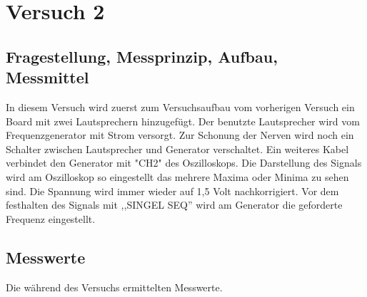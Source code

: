 \documentclass[12pt, oneside, a4paper, \docLanguage]{report}
\begin{document}
%
%
\chapter{Versuch 2}
\label{chap:VERSUCH_2}


\section{Fragestellung, Messprinzip, Aufbau, Messmittel}
\label{chap:VERSUCH_2_FRAGESTELLUNG}

In diesem Versuch wird zuerst zum Versuchsaufbau vom vorherigen Versuch ein Board mit zwei Lautsprechern hinzugefügt. Der benutzte Lautsprecher wird vom Frequenzgenerator mit Strom versorgt. Zur Schonung der Nerven wird noch ein Schalter zwischen Lautsprecher und Generator verschaltet. Ein weiteres Kabel verbindet den Generator mit "CH2" des Oszilloskops. Die Darstellung des Signals wird am Oszilloskop so eingestellt das mehrere Maxima oder Minima zu sehen sind. Die Spannung wird immer wieder auf 1,5 Volt nachkorrigiert. Vor dem festhalten des Signals mit ,,SINGEL SEQ'' wird am Generator die geforderte Frequenz eingestellt.

\newpage

\section{Messwerte}
\label{chap:VERSUCH_2_MESSWERTE}

Die während des Versuchs ermittelten Messwerte.
\end{document}
